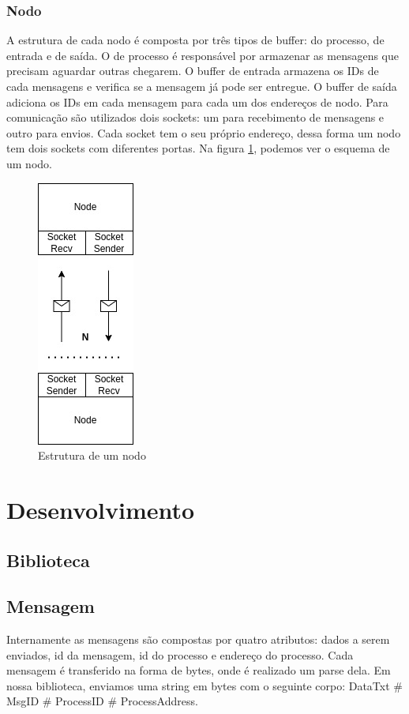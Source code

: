 \documentclass[
	12pt,				%
	openright,			%
	oneside,			%
	a4paper,			%
	english,			%
	french,				%
	spanish,			%
	brazil				%
	]{abntex2}
\begin{document}
\subsection{Nodo}
A estrutura de cada nodo é composta por três tipos de buffer: do processo, de entrada e de saída.
O de processo é responsável por armazenar as mensagens que precisam aguardar outras chegarem.
O buffer de entrada armazena os IDs de cada mensagens e verifica se a mensagem já pode ser entregue.
O buffer de saída adiciona os IDs em cada mensagem para cada um dos endereços de nodo.
Para comunicação são utilizados dois sockets: um para recebimento de
mensagens e outro para envios. Cada socket tem o seu próprio endereço,
dessa forma um nodo tem dois sockets com diferentes portas. Na figura \ref{fig:nodo},
podemos ver o esquema de um nodo.

\begin{figure}[!h]
    \centering
    \includegraphics[scale=0.9]{node.jpg}
    \caption{Estrutura de um nodo}
    \label{fig:nodo}
\end{figure}

\chapter{Desenvolvimento}
\section{Biblioteca}
\section{Mensagem}
Internamente as mensagens são compostas por quatro atributos: dados a serem enviados, id da mensagem,
id do processo e endereço do processo. Cada mensagem é transferido na forma de bytes,
onde é realizado um parse dela. Em nossa biblioteca, enviamos uma string em bytes com o seguinte
corpo: DataTxt \# MsgID \# ProcessID \# ProcessAddress.
\end{document}
